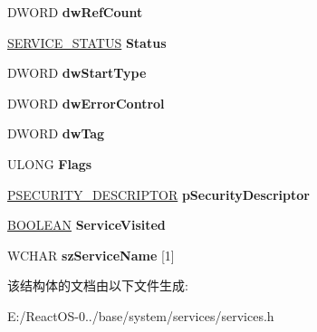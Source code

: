 \begin{DoxyCompactItemize}
D\+W\+O\+RD {\bfseries dw\+Ref\+Count}
\item 
\mbox{\label{struct___s_e_r_v_i_c_e_a9ad2f1b90e651348a854574c671a1ef4}} 
\hyperlink{struct___s_e_r_v_i_c_e___s_t_a_t_u_s}{S\+E\+R\+V\+I\+C\+E\+\_\+\+S\+T\+A\+T\+US} {\bfseries Status}
\item 
\mbox{\label{struct___s_e_r_v_i_c_e_ab7ddbb73b164c483e9eee99d41592325}} 
D\+W\+O\+RD {\bfseries dw\+Start\+Type}
\item 
\mbox{\label{struct___s_e_r_v_i_c_e_a661b12989d4d329cf0267f1e708aa99b}} 
D\+W\+O\+RD {\bfseries dw\+Error\+Control}
\item 
\mbox{\label{struct___s_e_r_v_i_c_e_acf11f33b65e9ff203bc5e1bc563c49db}} 
D\+W\+O\+RD {\bfseries dw\+Tag}
\item 
\mbox{\label{struct___s_e_r_v_i_c_e_a1fd191084576926a405429b9ecaf594c}} 
U\+L\+O\+NG {\bfseries Flags}
\item 
\mbox{\label{struct___s_e_r_v_i_c_e_a63788887f8b293dd65258788f58f1f9b}} 
\hyperlink{struct___s_e_c_u_r_i_t_y___d_e_s_c_r_i_p_t_o_r}{P\+S\+E\+C\+U\+R\+I\+T\+Y\+\_\+\+D\+E\+S\+C\+R\+I\+P\+T\+OR} {\bfseries p\+Security\+Descriptor}
\item 
\mbox{\label{struct___s_e_r_v_i_c_e_aa615e21c8eb0a99f9ca216cff2b3fc60}} 
\hyperlink{_processor_bind_8h_a112e3146cb38b6ee95e64d85842e380a}{B\+O\+O\+L\+E\+AN} {\bfseries Service\+Visited}
\item 
\mbox{\label{struct___s_e_r_v_i_c_e_abd2bfc6c6c817fbf326be9cc35fdc2eb}} 
W\+C\+H\+AR {\bfseries sz\+Service\+Name} \mbox{[}1\mbox{]}
\end{DoxyCompactItemize}


该结构体的文档由以下文件生成\+:\begin{DoxyCompactItemize}
\item 
E\+:/\+React\+O\+S-\/0../base/system/services/services.\+h\end{DoxyCompactItemize}
